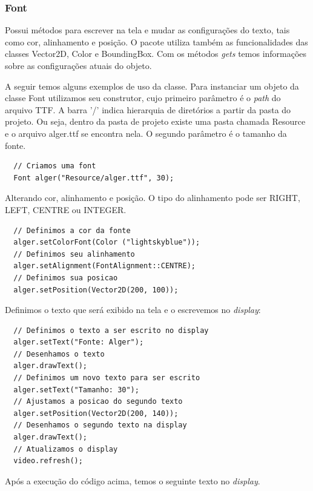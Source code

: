 \subsubsection{Font}
%
%
Possui métodos para escrever na tela e mudar as configurações do texto, tais como cor, alinhamento e posição. O pacote utiliza também as funcionalidades das classes Vector2D, Color e BoundingBox. Com os métodos \textit{gets} temos informações sobre as configurações atuais do objeto.
\par 
A seguir temos alguns exemplos de uso da classe. Para instanciar um objeto da classe Font utilizamos seu construtor, cujo primeiro parâmetro é o \textit{path} do arquivo TTF. A barra '/' indica hierarquia de diretórios a partir da pasta do projeto. Ou seja, dentro da pasta de projeto existe uma pasta chamada Resource e o arquivo alger.ttf se encontra nela. O segundo parâmetro é o tamanho da fonte.
%
\begin{lstlisting}
  // Criamos uma font
  Font alger("Resource/alger.ttf", 30);
\end{lstlisting}
%
\par
Alterando cor, alinhamento e posição. O tipo do alinhamento pode ser RIGHT, LEFT, CENTRE ou INTEGER.
%
\begin{lstlisting}
  // Definimos a cor da fonte
  alger.setColorFont(Color ("lightskyblue"));
  // Definimos seu alinhamento
  alger.setAlignment(FontAlignment::CENTRE);
  // Definimos sua posicao
  alger.setPosition(Vector2D(200, 100));
\end{lstlisting}
%
\par 
Definimos o texto que será exibido na tela e o escrevemos no \textit{display}:
%
\begin{lstlisting}
  // Definimos o texto a ser escrito no display
  alger.setText("Fonte: Alger");
  // Desenhamos o texto
  alger.drawText();
  // Definimos um novo texto para ser escrito
  alger.setText("Tamanho: 30");
  // Ajustamos a posicao do segundo texto
  alger.setPosition(Vector2D(200, 140));
  // Desenhamos o segundo texto na display
  alger.drawText();
  // Atualizamos o display
  video.refresh();
\end{lstlisting}
%
Após a execução do código acima, temos o seguinte texto no \textit{display}.
%
%
%
